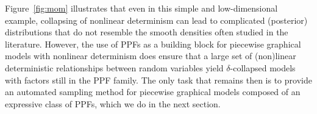 \documentclass{article} %
\begin{document}
Figure~\ref{fig:mom} illustrates that even in this simple and
low-dimensional example, collapsing of nonlinear determinism can lead
to complicated (posterior) distributions that do not resemble the
smooth densities often studied in the literature.  However, the use of
PPFs as a building block for piecewise graphical models with nonlinear
determinism does ensure that a large set of (non)linear deterministic
relationships between random variables yield $\delta$-collapsed models
with factors still in the PPF family.  The only task that remains then
is to provide an automated sampling method for piecewise graphical
models composed of an expressive class of PPFs, which we do in the
next section.
\end{document}
